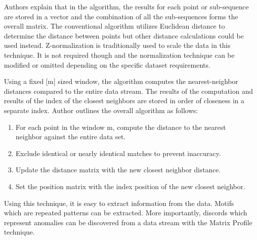 Authors \cite{yeh2016matrix-profile-1} explain that in the algorithm, the results for each point or sub-sequence are stored in a vector and the combination of all the sub-sequences forms the overall matrix. The conventional algorithm utilizes Euclidean distance to determine the distance between points but other distance calculations could be used instead. Z-normalization is traditionally used to scale the data in this technique. It is not required though and the normalization technique can be modified or omitted depending on the specific dataset requirements.

Using a fixed [m] sized window, the algorithm computes the nearest-neighbor distances compared to the entire data stream. The results of the computation and results of the index of the closest neighbors are stored in order of closeness in a separate index. Author \cite{matrix-profile-intro} outlines the overall algorithm as follows:
\begin{enumerate}
    \item For each point in the window m, compute the distance to the nearest neighbor against the entire data set.
    \item Exclude identical or nearly identical matches to prevent inaccuracy.
    \item Update the distance matrix with the new closest neighbor distance.
    \item Set the position matrix with the index position of the new closest neighbor.
\end{enumerate}

Using this technique, it is easy to extract information from the data. Motifs which are repeated patterns can be extracted. More importantly, discords which represent anomalies can be discovered from a data stream with the Matrix Profile technique. 




